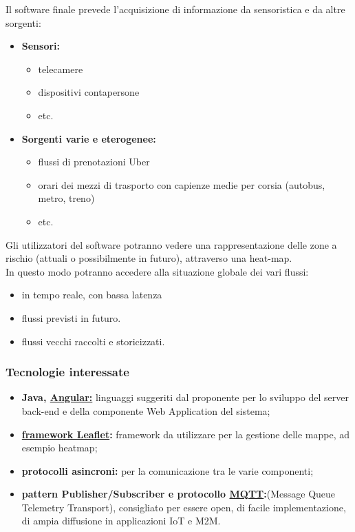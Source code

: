 Il software finale prevede l'acquisizione di informazione da sensoristica e da altre sorgenti:
\begin{itemize}
	\item{\textbf{Sensori:}}
	    \begin{itemize}
	        \item telecamere
	        \item dispositivi contapersone
	        \item etc.
	    \end{itemize}
	\item{\textbf{Sorgenti varie e eterogenee:}}
	    \begin{itemize}
	        \item flussi di prenotazioni Uber
	        \item orari dei mezzi di trasporto con capienze medie per corsia (autobus, metro, treno)
	        \item etc.
	\end{itemize}
\end{itemize}
Gli utilizzatori del software potranno vedere una rappresentazione delle zone a rischio (attuali o possibilmente in futuro), attraverso una heat-map.\\
In questo modo potranno accedere alla situazione globale dei vari flussi:
\begin{itemize}
    \item in tempo reale, con bassa latenza
    \item flussi previsti in futuro.
    \item flussi vecchi raccolti e storicizzati.
\end{itemize}


\subsubsection{Tecnologie interessate}

\begin{itemize}
	\item{\textbf{Java, \href{https://angular.io/}{Angular:}}} linguaggi suggeriti dal proponente per lo sviluppo del server back-end e della componente Web Application del sistema;
	\item{\textbf{\href{https://leafletjs.com/}{framework Leaflet}:}} framework da utilizzare per la gestione delle mappe, ad esempio heatmap;
	\item{\textbf{protocolli asincroni:}} per la comunicazione tra le varie componenti;
	\item{\textbf{pattern Publisher/Subscriber e protocollo \href{https://mqtt.org/}{MQTT}:}}\newline (Message Queue Telemetry Transport), consigliato per essere open, di facile implementazione, di ampia diffusione in applicazioni IoT e M2M.
\end{itemize}

